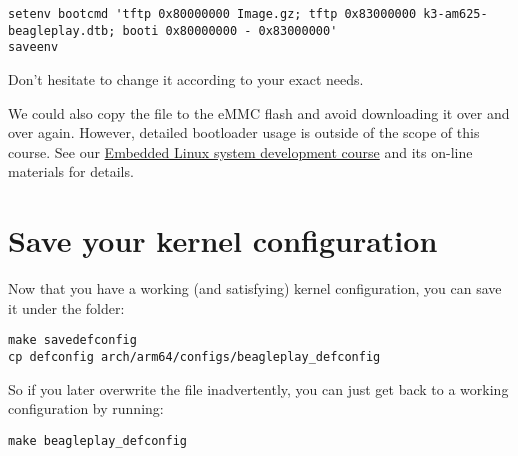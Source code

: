 {\scriptsize
\begin{verbatim}
setenv bootcmd 'tftp 0x80000000 Image.gz; tftp 0x83000000 k3-am625-beagleplay.dtb; booti 0x80000000 - 0x83000000'
saveenv
\end{verbatim}
}

Don't hesitate to change it according to your exact needs.

We could also copy the  file to the eMMC flash and avoid
downloading it over and over again. However, detailed bootloader
usage is outside of the scope of this course. See our
\href{https://bootlin.com/training/embedded-linux/}{Embedded
Linux system development course} and its on-line materials for
details.

\section{Save your kernel configuration}

Now that you have a working (and satisfying) kernel configuration, you
can save it under the  folder:

{\scriptsize
\begin{verbatim}
make savedefconfig
cp defconfig arch/arm64/configs/beagleplay_defconfig
\end{verbatim}
}

So if you later overwrite the  file inadvertently, you can
just get back to a working configuration by running:

{\scriptsize
\begin{verbatim}
make beagleplay_defconfig
\end{verbatim}
}

